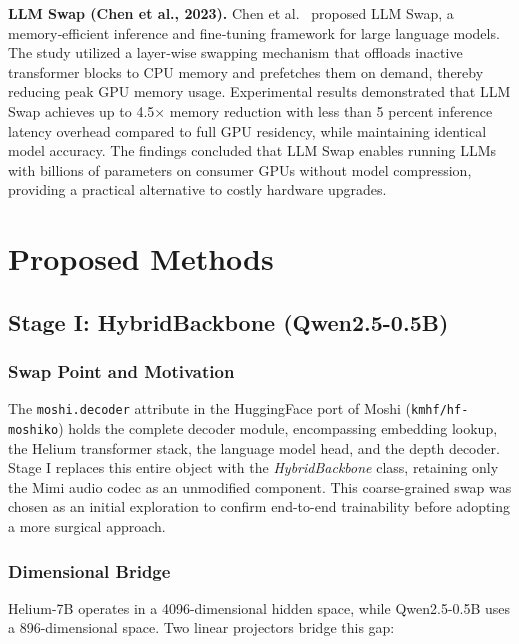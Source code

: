 \documentclass[conference]{IEEEtran}
\begin{document}
\textbf{LLM Swap (Chen et al., 2023).}
Chen et al.~\cite{chen2023llmswap} proposed LLM Swap, a memory‑efficient inference and fine‑tuning framework for large language models. The study utilized a layer‑wise swapping mechanism that offloads inactive transformer blocks to CPU memory and prefetches them on demand, thereby reducing peak GPU memory usage. Experimental results demonstrated that LLM Swap achieves up to 4.5× memory reduction with less than 5 percent inference latency overhead compared to full GPU residency, while maintaining identical model accuracy. The findings concluded that LLM Swap enables running LLMs with billions of parameters on consumer GPUs without model compression, providing a practical alternative to costly hardware upgrades.



\section{Proposed Methods}
\label{sec:method}

\subsection{Stage I: HybridBackbone (Qwen2.5-0.5B)}
\label{sec:method_s1}

\subsubsection{Swap Point and Motivation}

The \texttt{moshi.decoder} attribute in the HuggingFace port of Moshi
(\texttt{kmhf/hf-moshiko}) holds the complete decoder module, encompassing
embedding lookup, the Helium transformer stack, the language model head, and
the depth decoder.
Stage I replaces this entire object with the \emph{HybridBackbone} class,
retaining only the Mimi audio codec as an unmodified component.
This coarse-grained swap was chosen as an initial exploration to confirm
end-to-end trainability before adopting a more surgical approach.

\subsubsection{Dimensional Bridge}

Helium-7B operates in a 4096-dimensional hidden space, while Qwen2.5-0.5B
uses a 896-dimensional space.
Two linear projectors bridge this gap:
\end{document}
